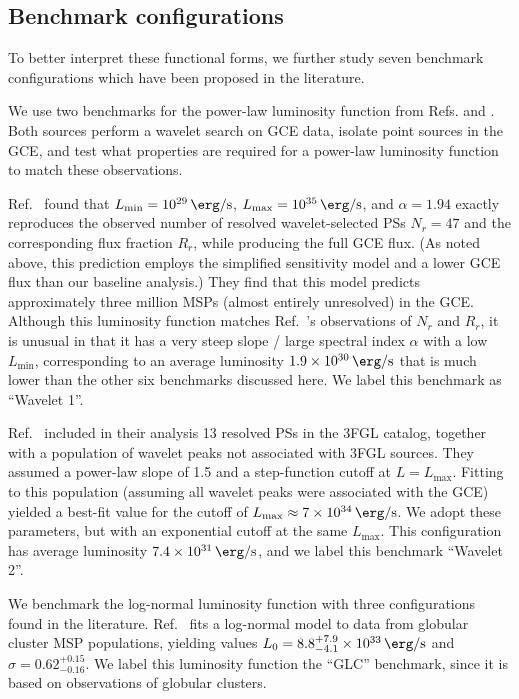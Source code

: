 \documentclass[letter,11pt]{article}
\begin{document}
\subsection{Benchmark configurations}

 To better interpret these functional forms, we further study seven benchmark configurations which have been proposed in the literature.

We use two benchmarks for the power-law luminosity function from Refs. \cite{Zhong:2019ycb} and \cite{Bartels:2015aea}. Both sources perform a wavelet search on GCE data, isolate point sources in the GCE, and test what properties are required for a power-law luminosity function to match these observations.

Ref.~\cite{Zhong:2019ycb} found that $L_\text{min}=\SI{e29}{\erg\per\second}$, $L_\text{max}=\SI{e35}{\erg\per\second}$, and $\alpha =1.94$ exactly reproduces the observed number of resolved wavelet-selected PSs $N_r=47$ and the corresponding flux fraction $R_r$, while producing the full GCE flux. (As noted above, this prediction employs the simplified sensitivity model and a lower GCE flux than our baseline analysis.) They find that this model predicts approximately three million MSPs (almost entirely unresolved) in the GCE. Although this luminosity function matches Ref.~\cite{Zhong:2019ycb}'s observations of $N_r$ and $R_r$, it is unusual in that it has a very steep slope / large spectral index $\alpha$ with a low $L_\text{min}$, corresponding to an average luminosity $\SI{1.9e30}{\erg\per\second}$ that is much lower than the other six benchmarks discussed here. We label this benchmark as ``Wavelet 1''.

Ref.~\cite{Bartels:2015aea} included in their analysis 13 resolved PSs in the 3FGL catalog, together with a population of wavelet peaks not associated with 3FGL sources. They assumed a power-law slope of 1.5 and a step-function cutoff at $L=L_\text{max}$. Fitting to this population (assuming all wavelet peaks were associated with the GCE) yielded a best-fit value for the cutoff of $L_\text{max}\approx\SI{7e34}{\erg\per\second}$. We adopt these parameters, but with an exponential cutoff at the same $L_\text{max}$. This configuration has average luminosity $\SI{7.4e31}{\erg\per\second}$, and we label this benchmark ``Wavelet 2''.

We benchmark the log-normal luminosity function with three configurations found in the literature. Ref.~\cite{Hooper16} fits a log-normal model to data from globular cluster MSP populations, yielding values $L_0 = 8.8^{+7.9}_{-4.1}\times \SI{e33}{\erg\per\second}$ and $\sigma=0.62^{+0.15}_{-0.16}$. We label this luminosity function the ``GLC'' benchmark, since it is based on observations of globular clusters.
\end{document}

